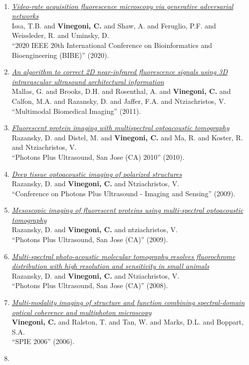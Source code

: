 \documentclass{resume}
\begin{document}
\begin{category}{~~}
\begin{enumerate}
\item \href{https://cvinegoni.github.io/assets/pdf/proceedings/2020-BIBE.pdf}{\it Video-rate acquisition fluorescence microscopy via generative adversarial networks} \\ Issa, T.B. and {\bf Vinegoni, C.} and Shaw, A. and Feruglio, P.F. and Weissleder, R. and Uminsky, D. \\ ``2020 IEEE 20th International Conference on Bioinformatics and Bioengineering (BIBE)''  (2020). \item \href{https://cvinegoni.github.io/assets/pdf/proceedings/2011-SPIE.pdf}{\it An algorithm to correct 2D near-infrared fluorescence signals using 3D intravascular ultrasound architectural information} \\ Mallas, G. and Brooks, D.H. and Rosenthal, A. and {\bf Vinegoni, C.} and Calfon, M.A. and Razansky, D. and Jaffer, F.A. and Ntziachristos, V. \\ ``Multimodal Biomedical Imaging''  (2011). \item \href{https://cvinegoni.github.io/assets/pdf/proceedings/2010-SPIE.pdf}{\it Fluorescent protein imaging with multispectral optoacoustic tomography} \\ Razansky, D. and Distel, M. and {\bf Vinegoni, C.} and Ma, R. and Koster, R. and Ntziachristos, V. \\ ``Photons Plus Ultrasound, San Jose (CA) 2010''  (2010). \item \href{https://cvinegoni.github.io/assets/pdf/proceedings/2009-BIOS-2.pdf}{\it Deep tissue optoacoustic imaging of polarized structures} \\ Razansky, D. and {\bf Vinegoni, C.} and Ntziachristos, V. \\ ``Conference on Photons Plus Ultrasound - Imaging and Sensing''  (2009). \item \href{https://cvinegoni.github.io/assets/pdf/proceedings/2009-BIOS-1.pdf}{\it Mesoscopic imaging of fluorescent proteins using multi-spectral optoacoustic tomography} \\ Razansky, D. and {\bf Vinegoni, C.} and ntziachristos, V. \\ ``Photons Plus Ultrasound, San Jose (CA)''  (2009). \item \href{https://cvinegoni.github.io/assets/pdf/proceedings/2008-SPIE.pdf}{\it Multi-spectral photo-acoustic molecular tomography resolves fluorochrome distribution with high resolution and sensitivity in small animals} \\ Razansky, D. and {\bf Vinegoni, C.} and Ntziachristos, V. \\ ``Photons Plus Ultrasound, San Jose (CA)''  (2008). \item \href{https://cvinegoni.github.io/assets/pdf/proceedings/2006-SPIE.pdf}{\it Multi-modality imaging of structure and function combining spectral-domain optical coherence and multiphoton microscopy} \\ {\bf Vinegoni, C.} and Ralston, T. and Tan, W. and Marks, D.L. and Boppart, S.A. \\ ``SPIE 2006''  (2006). \item 
\end{enumerate}
\end{category}
\end{document}
